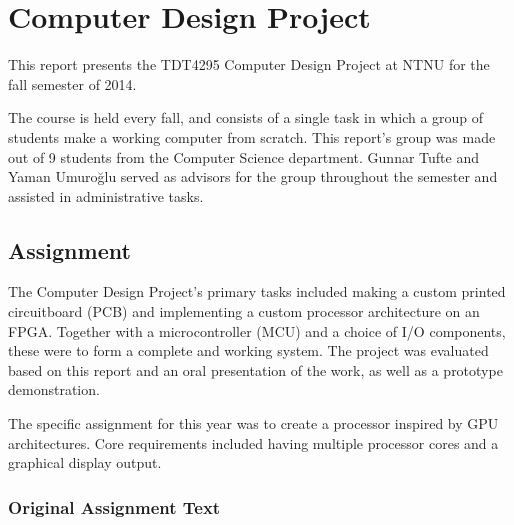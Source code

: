 \documentclass[../main/report.tex]{subfiles}
\begin{document}
\chapter{Computer Design Project}
\label{sec:intro}

This report presents the TDT4295 Computer Design Project at NTNU for the fall semester of 2014.

The course is held every fall, and consists of a single task in which a group of students make a working computer from scratch.
This report's group was made out of 9 students from the Computer Science department.
Gunnar Tufte and Yaman Umuroğlu served as advisors for the group throughout the semester and assisted in administrative tasks.

\section{Assignment}

The Computer Design Project's primary tasks included making a custom printed circuitboard (PCB) and implementing a custom processor architecture on an FPGA.
Together with a microcontroller (MCU) and a choice of I/O components, these were to form a complete and working system.
The project was evaluated based on this report and an oral presentation of the work, as well as a prototype demonstration.

The specific assignment for this year was to create a processor inspired by GPU architectures.
Core requirements included having multiple processor cores and a graphical display output.

\newpage

\subsection{Original Assignment Text}

\vspace{1cm}
\noindent
\end{document}
